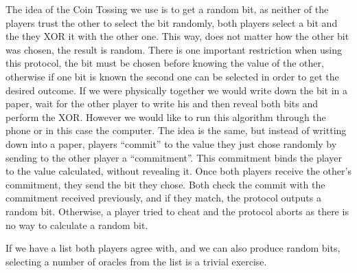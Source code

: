 The idea of the Coin Tossing we use is to get a random bit, as neither of the
  players trust the other to select the bit randomly, both players select a bit
  and the they XOR it with the other one.
This way, does not matter how the other bit was chosen, the result is random.
There is one important restriction when using this protocol, the bit must be
  chosen before knowing the value of  the other, otherwise if one bit is known
  the second one can be selected in order to get the desired outcome.
If we were physically together we would write down the bit in a paper, wait for
  the other player to write his and then reveal both bits and perform the XOR.
However we would like to run this algorithm through the phone or in this case
  the computer.
The idea is the same, but instead of writting down into a paper, players
  ``commit'' to the value they just chose randomly by sending to the other
  player a ``commitment''.
This commitment binds the player to the value calculated, without revealing it.
Once both players receive the other's commitment, they send the bit they chose.
Both check the commit with the commitment received previously, and if they
  match, the protocol outputs a random bit.
Otherwise, a player tried to cheat and the protocol aborts as there is no way to
  calculate a random bit.

If we have a list both players agree with, and we can also produce random bits,
  selecting a number of oracles from the list is a trivial exercise.


